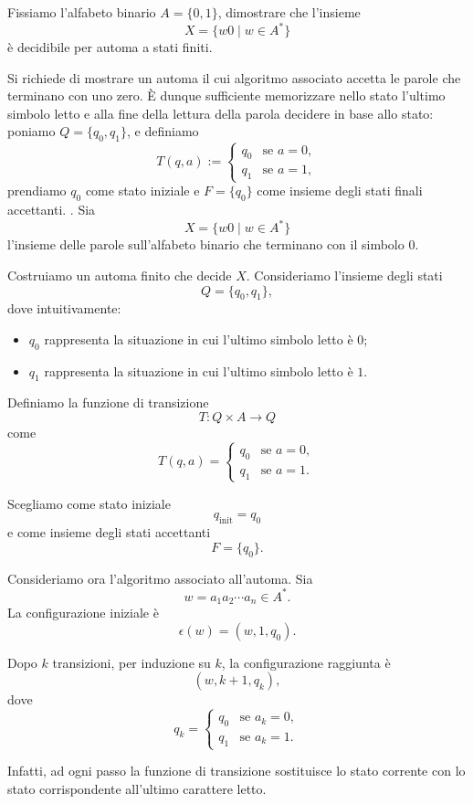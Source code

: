 \begin{ex}\label{es:1}
Fissiamo l'alfabeto binario $A=\{0,1\}$, dimostrare che l'insieme
\[
X = \{ w0 \mid w\in A^* \}
\]
è decidibile per automa a stati finiti.
\end{ex}
\begin{sol} Si richiede di mostrare un automa il cui algoritmo associato accetta le parole che terminano con uno zero. È dunque sufficiente memorizzare nello stato l'ultimo simbolo letto e alla fine della lettura della parola decidere in base allo stato: poniamo $Q=\{q_0,q_1\}$, e definiamo
\[
T(q,a) :=
\begin{cases}
q_0 & \text{se } a=0, \\
q_1 & \text{se } a=1,
\end{cases}
\]
prendiamo $q_0$ come stato iniziale e $F=\{q_0\}$ come insieme degli stati finali accettanti.
.
Sia
\[
X=\{w0\mid w\in A^*\}
\]
l'insieme delle parole sull'alfabeto binario che terminano con il simbolo \(0\).

Costruiamo un automa finito che decide \(X\). Consideriamo l'insieme degli stati
\[
Q=\{q_0,q_1\},
\]
dove intuitivamente:
\begin{itemize}
    \item \(q_0\) rappresenta la situazione in cui l'ultimo simbolo letto è \(0\);
    \item \(q_1\) rappresenta la situazione in cui l'ultimo simbolo letto è \(1\).
\end{itemize}

Definiamo la funzione di transizione
\[
T:Q\times A\to Q
\]
come
\[
T(q,a)=
\begin{cases}
q_0 & \text{se } a=0,\\
q_1 & \text{se } a=1.
\end{cases}
\]

Scegliamo come stato iniziale
\[
q_{\mathrm{init}}=q_0
\]
e come insieme degli stati accettanti
\[
F=\{q_0\}.
\]

Consideriamo ora l'algoritmo associato all'automa.
Sia
\[
w=a_1a_2\cdots a_n\in A^*.
\]
La configurazione iniziale è
\[
\epsilon(w)=(w,1,q_0).
\]

Dopo \(k\) transizioni, per induzione su \(k\), la configurazione raggiunta è
\[
(w,k+1,q_k),
\]
dove
\[
q_k=
\begin{cases}
q_0 & \text{se } a_k=0,\\
q_1 & \text{se } a_k=1.
\end{cases}
\]

Infatti, ad ogni passo la funzione di transizione sostituisce lo stato corrente con lo stato corrispondente all'ultimo carattere letto.


\end{sol}
